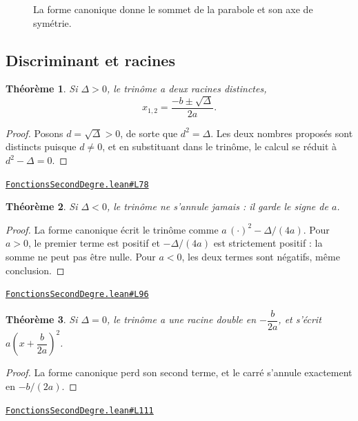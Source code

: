 \documentclass[11pt,a4paper]{article}
\theoremstyle{definition}
\theoremstyle{plain}
\newtheorem{theoreme}{Théorème}
\newcommand{\source}[2]{\par\smallskip\noindent\hfill{\footnotesize\href{#1}{\texttt{#2}}}\par\smallskip}
\begin{document}
\begin{figure}[h]
\centering

\caption{La forme canonique donne le sommet de la parabole et son axe de symétrie.}
\end{figure}

\subsection{Discriminant et racines}

\begin{theoreme}
Si $\Delta > 0$, le trinôme a deux racines distinctes,
\[ x_{1,2} = \frac{-b \pm \sqrt{\Delta}}{2a} . \]
\end{theoreme}

\begin{proof}
Posons $d = \sqrt{\Delta} > 0$, de sorte que $d^2 = \Delta$. Les deux nombres proposés
sont distincts puisque $d \ne 0$, et en substituant dans le trinôme, le calcul se réduit à
$d^2 - \Delta = 0$.
\end{proof}
\source{https://github.com/Commutator-IO/learn-lean/blob/main/courses/02-lycee/02-fonctions-second-degre/FonctionsSecondDegre.lean\#L78}{FonctionsSecondDegre.lean\#L78}

\begin{theoreme}
Si $\Delta < 0$, le trinôme ne s'annule jamais : il garde le signe de $a$.
\end{theoreme}

\begin{proof}
La forme canonique écrit le trinôme comme $a\,(\cdot)^2 - \Delta/(4a)$. Pour $a > 0$, le
premier terme est positif et $-\Delta/(4a)$ est strictement positif : la somme ne peut pas
être nulle. Pour $a < 0$, les deux termes sont négatifs, même conclusion.
\end{proof}
\source{https://github.com/Commutator-IO/learn-lean/blob/main/courses/02-lycee/02-fonctions-second-degre/FonctionsSecondDegre.lean\#L96}{FonctionsSecondDegre.lean\#L96}

\begin{theoreme}
Si $\Delta = 0$, le trinôme a une racine double en $-\dfrac{b}{2a}$, et s'écrit
$a\left(x + \dfrac{b}{2a}\right)^2$.
\end{theoreme}

\begin{proof}
La forme canonique perd son second terme, et le carré s'annule exactement en
$-b/(2a)$.
\end{proof}
\source{https://github.com/Commutator-IO/learn-lean/blob/main/courses/02-lycee/02-fonctions-second-degre/FonctionsSecondDegre.lean\#L111}{FonctionsSecondDegre.lean\#L111}
\end{document}

